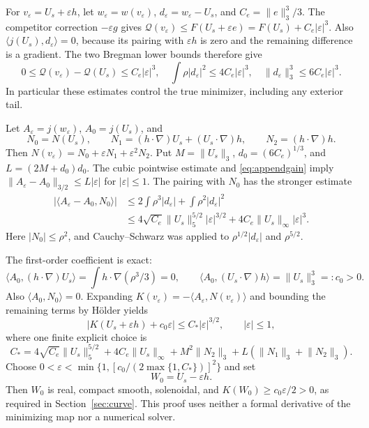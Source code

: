 \documentclass[11pt,a4paper]{article}
\theoremstyle{definition}\newtheorem{definition}[theorem]{Definition}
\theoremstyle{remark}\newtheorem{remark}[theorem]{Remark}
\newcommand{\Q}{\mathcal Q}
\newcommand{\norm}[1]{\lVert #1\rVert}
\newcommand{\ip}[2]{\langle #1,#2\rangle}
\numberwithin{equation}{section}
\begin{document}
For $v_\varepsilon=U_s+\varepsilon h$, let
$w_\varepsilon=w(v_\varepsilon)$, $d_\varepsilon=w_\varepsilon-U_s$, and $C_e=\norm e_3^3/3$. The competitor correction $-\varepsilon g$ gives
$\Q(v_\varepsilon)\le F(U_s+\varepsilon e)=F(U_s)+C_e|\varepsilon|^3$.
Also $\ip{j(U_s)}{d_\varepsilon}=0$, because its pairing with $\varepsilon h$ is zero and the remaining difference is a gradient. The two Bregman lower bounds therefore give
\begin{equation}\label{eq:appendgain}
 0\le\Q(v_\varepsilon)-\Q(U_s)\le C_e|\varepsilon|^3,
 \quad \int\rho|d_\varepsilon|^2\le4C_e|\varepsilon|^3,
 \quad \norm{d_\varepsilon}_3^3\le6C_e|\varepsilon|^3.
\end{equation}
In particular these estimates control the true minimizer, including any exterior tail.

Let $A_\varepsilon=j(w_\varepsilon)$, $A_0=j(U_s)$, and
\[
 N_0=N(U_s),\qquad
 N_1=(h\cdot\nabla)U_s+(U_s\cdot\nabla)h,
 \qquad N_2=(h\cdot\nabla)h.
\]
Then $N(v_\varepsilon)=N_0+\varepsilon N_1+\varepsilon^2N_2$.
Put $M=\norm{U_s}_3$, $d_0=(6C_e)^{1/3}$, and $L=(2M+d_0)d_0$.
The cubic pointwise estimate and \eqref{eq:appendgain} imply
$\norm{A_\varepsilon-A_0}_{3/2}\le L|\varepsilon|$ for $|\varepsilon|\le1$.
The pairing with $N_0$ has the stronger estimate
\begin{align*}
 |\ip{A_\varepsilon-A_0}{N_0}|
 &\le2\int\rho^3|d_\varepsilon|+\int\rho^2|d_\varepsilon|^2\\
 &\le4\sqrt{C_e}\norm{U_s}_5^{5/2}|\varepsilon|^{3/2}
       +4C_e\norm{U_s}_\infty|\varepsilon|^3.
\end{align*}
Here $|N_0|\le\rho^2$, and Cauchy--Schwarz was applied to $\rho^{1/2}|d_\varepsilon|$ and $\rho^{5/2}$.

The first-order coefficient is exact:
\[
 \ip{A_0}{(h\cdot\nabla)U_s}
   =\int h\cdot\nabla(\rho^3/3)=0,
 \qquad \ip{A_0}{(U_s\cdot\nabla)h}=\norm{U_s}_3^3=:c_0>0.
\]
Also $\ip{A_0}{N_0}=0$. Expanding $K(v_\varepsilon)=-\ip{A_\varepsilon}{N(v_\varepsilon)}$ and bounding the remaining terms by H\"older yields
\begin{equation}\label{eq:appendK}
 |K(U_s+\varepsilon h)+c_0\varepsilon|
 \le C_*|\varepsilon|^{3/2},\qquad |\varepsilon|\le1,
\end{equation}
where one finite explicit choice is
\[
 C_*=4\sqrt{C_e}\norm{U_s}_5^{5/2}
       +4C_e\norm{U_s}_\infty+M^2\norm{N_2}_3
       +L(\norm{N_1}_3+\norm{N_2}_3).
\]
Choose
$0<\varepsilon<\min\{1,[c_0/(2\max\{1,C_*\})]^2\}$ and set
\begin{equation}\label{eq:W0}
 W_0=U_s-\varepsilon h.
\end{equation}
Then $W_0$ is real, compact smooth, solenoidal, and $K(W_0)\ge c_0\varepsilon/2>0$, as required in Section~\ref{sec:curve}. This proof uses neither a formal derivative of the minimizing map nor a numerical solver.
\end{document}
